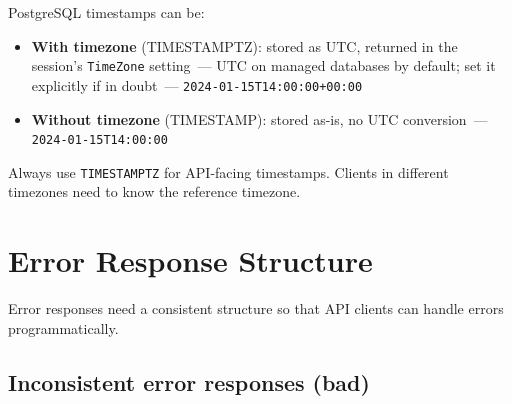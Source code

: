 PostgreSQL timestamps can be:

\begin{itemize}
\tightlist
\item
  \textbf{With timezone} (TIMESTAMPTZ): stored as UTC, returned in the session's \texttt{TimeZone} setting~--- UTC on managed databases by default; set it explicitly if in doubt~--- \texttt{2024-}\allowbreak{}\texttt{01-}\allowbreak{}\texttt{15T14:}\allowbreak{}\texttt{00:}\allowbreak{}\texttt{00+00:}\allowbreak{}\texttt{00}
\item
  \textbf{Without timezone} (TIMESTAMP): stored as-is, no UTC conversion~--- \texttt{2024-01-15T14:00:00}
\end{itemize}

\noindent{}Always use \texttt{TIMESTAMPTZ} for API-facing timestamps. Clients in different timezones need to know the reference timezone.

\begin{codebox}[short]

\begin{Shaded}
\begin{Highlighting}[]
 
     \NormalTok{,}
 \NormalTok{,}
   \NormalTok{,}
\NormalTok{);}
\end{Highlighting}
\end{Shaded}

\end{codebox}

\setcounter{section}{4}
\section{Error Response Structure}\label{34-response-handling:345-error-response-structure}

Error responses need a consistent structure so that API clients can handle errors programmatically.

\subsection*{Inconsistent error responses (bad)}\label{34-response-handling:inconsistent-error-responses-bad}

